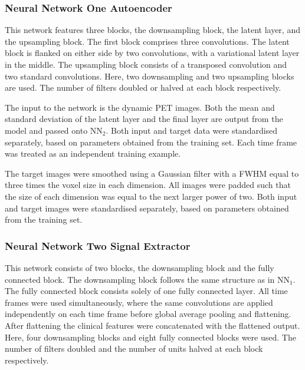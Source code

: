             \subsubsection{Neural Network One Autoencoder} \label{sec:a_bayesian_neural_network-based_method_for_the_extraction_of_a_metabolite_corrected_arterial_input_function_from_dynamic_pbr28_pet_appendix_methods_neural_network_design_neural_network_one_autoencoder}
                This network features three blocks, the downsampling block, the latent layer, and the upsampling block. The first block comprises three convolutions. The latent block is flanked on either side by two convolutions, with a variational latent layer in the middle. The upsampling block consists of a transposed convolution and two standard convolutions. Here, two downsampling and two upsampling blocks are used. The number of filters doubled or halved at each block respectively.
            
                The input to the network is the dynamic \gls{PET} images. Both the mean and standard deviation of the latent layer and the final layer are output from the model and passed onto \gls{NN}$_2$. Both input and target data were standardised separately, based on parameters obtained from the training set. Each time frame was treated as an independent training example.
    
                The target images were smoothed using a Gaussian filter with a \gls{FWHM} equal to three times the voxel size in each dimension. All images were padded such that the size of each dimension was equal to the next larger power of two. Both input and target images were standardised separately, based on parameters obtained from the training set.

            \subsubsection{Neural Network Two Signal Extractor} \label{sec:a_bayesian_neural_network-based_method_for_the_extraction_of_a_metabolite_corrected_arterial_input_function_from_dynamic_pbr28_pet_appendix_methods_neural_network_design_neural_network_two_signal_extractor}
                This network consists of two blocks, the downsampling block and the fully connected block. The downsampling block follows the same structure as in \gls{NN}$_1$. The fully connected block consists solely of one fully connected layer. All time frames were used simultaneously, where the same convolutions are applied independently on each time frame before global average pooling and flattening. After flattening the clinical features were concatenated with the flattened output. Here, four downsampling blocks and eight fully connected blocks were used. The number of filters doubled and the number of units halved at each block respectively.

